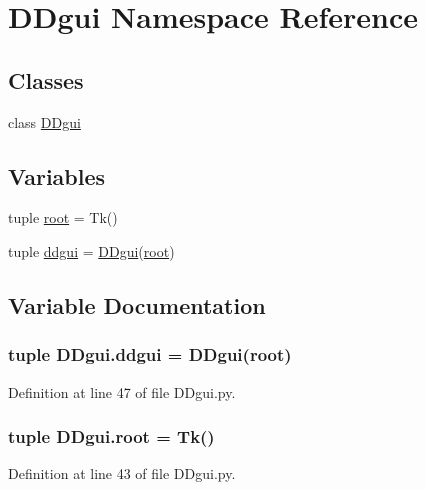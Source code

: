 \hypertarget{namespace_d_dgui}{}\section{D\+Dgui Namespace Reference}
\label{namespace_d_dgui}
\subsection*{Classes}
\begin{DoxyCompactItemize}
\item 
class \hyperlink{class_d_dgui_1_1_d_dgui}{D\+Dgui}
\end{DoxyCompactItemize}
\subsection*{Variables}
\begin{DoxyCompactItemize}
\item 
tuple \hyperlink{namespace_d_dgui_a5d3fc36f3f72e943008185ab8a9e1b9b}{root} = Tk()
\item 
tuple \hyperlink{namespace_d_dgui_aaf3399b98d25a68328c92b19da77f2d4}{ddgui} = \hyperlink{class_d_dgui_1_1_d_dgui}{D\+Dgui}(\hyperlink{namespace_d_dgui_a5d3fc36f3f72e943008185ab8a9e1b9b}{root})
\end{DoxyCompactItemize}


\subsection{Variable Documentation}
\hypertarget{namespace_d_dgui_aaf3399b98d25a68328c92b19da77f2d4}{}
\subsubsection[{ddgui}]{\setlength{\rightskip}{0pt plus 5cm}tuple D\+Dgui.\+ddgui = {\bf D\+Dgui}({\bf root})}\label{namespace_d_dgui_aaf3399b98d25a68328c92b19da77f2d4}


Definition at line 47 of file D\+Dgui.\+py.

\hypertarget{namespace_d_dgui_a5d3fc36f3f72e943008185ab8a9e1b9b}{}
\subsubsection[{root}]{\setlength{\rightskip}{0pt plus 5cm}tuple D\+Dgui.\+root = Tk()}\label{namespace_d_dgui_a5d3fc36f3f72e943008185ab8a9e1b9b}


Definition at line 43 of file D\+Dgui.\+py.

